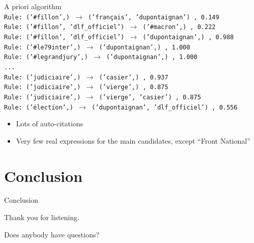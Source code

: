 \documentclass{beamer}
\begin{document}
\begin{frame}{A priori algorithm}
\begingroup
\fontsize{9pt}{12pt}
\texttt{\\
Rule: ('\#fillon',) $\to$ ('français', 'dupontaignan') , 0.149\\
Rule: ('\#fillon', 'dlf\_officiel') $\to$ ('\#macron',) , 0.222\\
Rule: ('\#fillon', 'dlf\_officiel') $\to$ ('dupontaignan',) , 0.988\\
Rule: ('\#le79inter',) $\to$ ('dupontaignan',) , 1.000\\
Rule: ('\#legrandjury',) $\to$ ('dupontaignan',) , 1.000\\
...\\
Rule: ('judiciaire',) $\to$ ('casier',) , 0.937\\
Rule: ('judiciaire',) $\to$ ('vierge',) , 0.875\\
Rule: ('judiciaire',) $\to$ ('vierge', 'casier') , 0.875\\
Rule: ('élection',) $\to$ ('dupontaignan', 'dlf\_officiel') , 0.556\\
}
\endgroup


\begin{itemize}
\item Lots of auto-citations
\item Very few real expressions for the main candidates, except ``Front National''
\end{itemize}
\end{frame}

\newpage
\section{Conclusion}
\begin{frame}{Conclusion}
\begin{center}
Thank you for listening. 
\bigskip


Does anybody have questions?
\end{center}
\end{frame}
 
\end{document}

